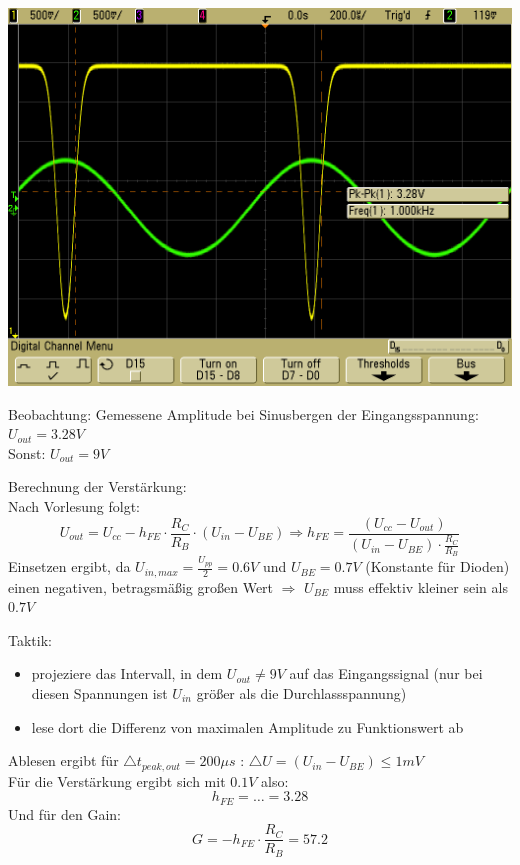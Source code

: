 \documentclass[compress,11pt]{beamer}
\begin{document}
\begin{frame}

\includegraphics[width=.7\textwidth]{../daten/oszi/scope_45}\\
\begin{block}{Beobachtung:}
Gemessene Amplitude bei Sinusbergen der Eingangsspannung: $U_{out} = 3.28 V$\\
Sonst: $U_{out} = 9 V$
\end{block}
\end{frame}
\begin{frame}
Berechnung der Verstärkung:\\
Nach Vorlesung folgt:
\begin{equation}
U_{out} = U_{cc} - h_{FE} \cdot \frac{R_C}{R_B} \cdot (U_{in} - U_{BE}) \Rightarrow h_{FE} = \frac{(U_{cc} - U_{out})}{(U_{in} - U_{BE}) \cdot \frac{R_C}{R_B}}
\end{equation}
Einsetzen ergibt, da $U_{in,max} = \frac{U_{pp}}{2} = 0.6 V$ und $U_{BE} = 0.7 V$ (Konstante für Dioden) einen negativen, betragsmäßig großen Wert $\Rightarrow$ $U_{BE}$ muss effektiv kleiner sein als $0.7 V$\\
\end{frame}
\begin{frame}

Taktik:
\begin{itemize}
\item projeziere das Intervall, in dem $U_{out} \neq 9 V$ auf das Eingangssignal (nur bei diesen Spannungen ist $U_{in}$ größer als die Durchlassspannung)
\item lese dort die Differenz von maximalen Amplitude zu Funktionswert ab
\end{itemize}


\end{frame}
\begin{frame}
Ablesen ergibt für $\bigtriangleup t_{peak,out} = 200 \mu s$ : $\bigtriangleup U = (U_{in} - U_{BE}) \leq 1 mV$ \\ Für die Verstärkung ergibt sich mit $0.1 V$ also:
\begin{equation}
h_{FE} = \dots 	= 3.28
\end{equation}
Und für den Gain:
\begin{equation}
G = -h_{FE} \cdot \frac{R_C}{R_B} = 57.2
\end{equation}
\end{frame}
\end{document}

